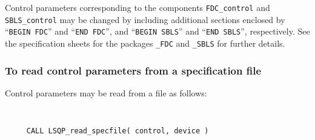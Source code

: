 \documentclass{galahad}
\begin{document}
Control parameters corresponding to the components 
{\tt FDC\_control}
and
{\tt SBLS\_control} may be changed by including additional sections enclosed by
``{\tt BEGIN FDC}'' and 
``{\tt END FDC}'', and
``{\tt BEGIN SBLS}'' and 
``{\tt END SBLS}'', respectively. 
See the specification sheets for the packages 
{\tt \libraryname\_FDC} 
and
{\tt \libraryname\_SBLS}
for further details.

\subsubsection{To read control parameters from a specification file}
\label{readspec}

Control parameters may be read from a file as follows:
\hskip0.5in 
\def\baselinestretch{0.8} {\tt 
\begin{verbatim}
     CALL LSQP_read_specfile( control, device )
\end{verbatim}}
\def\baselinestretch{1.0}
\end{document}
